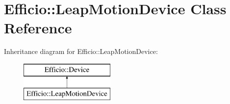 \hypertarget{class_efficio_1_1_leap_motion_device}{}\section{Efficio\+:\+:Leap\+Motion\+Device Class Reference}
\label{class_efficio_1_1_leap_motion_device}
Inheritance diagram for Efficio\+:\+:Leap\+Motion\+Device\+:\begin{figure}[H]
\begin{center}
\leavevmode
\includegraphics[height=2.000000cm]{class_efficio_1_1_leap_motion_device}
\end{center}
\end{figure}
